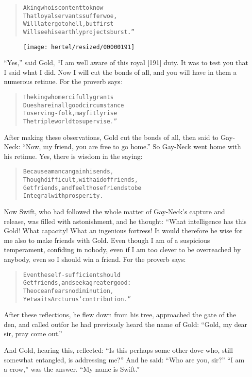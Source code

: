\documentclass[article, twoside, 10pt]{memoir}
\renewenvironment{verbatim}{%
\begin{quote}%
\vskip -10pt%
\begin{alltt}\normalfont\small}{\end{alltt}%
\end{quote}%
\vskip -10pt
} %
\begin{document}
\begin{verbatim}
A king who is content to know
That loyal servants suffer woe,
Will later go to hell, but first
Will see his earthly projects burst.”
\end{verbatim}
\begin{figure}[p]\texttt{[image: hertel/resized/00000191]}\end{figure}``Yes,'' said Gold, “I am well aware of this royal [191] duty. It
was to test you that I said what I did. Now I will cut the bonds of
all, and you will have in them a numerous retinue. For the proverb
says:

\begin{verbatim}
The king who mercifully grants
Due share in all good circumstance
To serving-folk, may fitly rise
The triple world to supervise.”
\end{verbatim}
After making these observations, Gold cut the bonds of all, then
said to Gay-Neck: ``Now, my friend, you are free to go home.'' So
Gay-Neck went home with his retinue. Yes, there is wisdom in the
saying:

\begin{verbatim}
Because a man can gain his ends,
Though difficult, with aid of friends,
Get friends, and feel those friends to be
Integral with prosperity.
\end{verbatim}
Now Swift, who had followed the whole matter of Gay-Neck's capture
and release, was filled with astonishment, and he thought: “What
intelligence has this Gold! What capacity! What an ingenious
fortress! It would therefore be wise for me also to make friends
with Gold. Even though I am of a suspicious temperament, confiding
in nobody, even if I am too clever to be overreached by anybody,
even so I should win a friend. For the proverb says:

\begin{verbatim}
Even the self-sufficient should
Get friends, and seek a greater good:
The ocean fears no diminution,
Yet waits Arcturus' contribution.”
\end{verbatim}
After these reflections, he flew down from his tree, approached the
gate of the den, and called out{\textemdash}for he had previously heard the
name of Gold: ``Gold, my dear sir, pray come out.''

And Gold, hearing this, reflected:
``Is this perhaps some other dove who, still somewhat entangled, is addressing me?''
And he said: ``Who are you, sir?'' ``I am a crow,'' was the answer.
``My name is Swift.''
\end{document}
